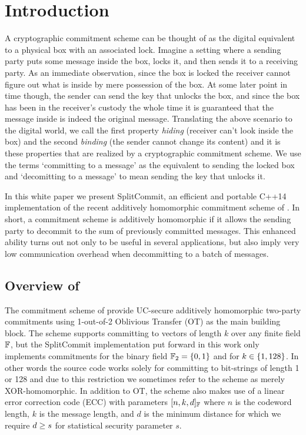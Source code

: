 \section{Introduction}

A cryptographic commitment scheme can be thought of as the digital equivalent to a  physical box with an associated lock. Imagine a setting where a sending party puts some message inside the box, locks it, and then sends it to a receiving party. As an immediate observation, since the box is locked the receiver cannot figure out what is inside by mere possession of the box. At some later point in time though, the sender can send the key that unlocks the box, and since the box has been in the receiver's custody the whole time it is guaranteed that the message inside is indeed the original message. Translating the above scenario to the digital world, we call the first property \textit{hiding} (receiver can't look inside the box) and the second \textit{binding} (the sender cannot change its content) and it is these properties that are realized by a cryptographic commitment scheme. We use the terms `committing to a message' as the equivalent to sending the locked box and `decomitting to a message' to mean sending the key that unlocks it.

In this white paper we present SplitCommit, an efficient and portable C++14 implementation of the recent additively homomorphic commitment scheme of \cite{DBLP:conf/tcc/FrederiksenJNT16}. In short, a commitment scheme is additively homomorphic if it allows the sending party to decommit to the sum of previously committed messages. This enhanced ability turns out not only to be useful in several applications, but also imply very low communication overhead when decommitting to a batch of messages.

\subsection{Overview of \cite{DBLP:conf/tcc/FrederiksenJNT16}}
The commitment scheme of \cite{DBLP:conf/tcc/FrederiksenJNT16} provide UC-secure additively homomorphic two-party commitments using 1-out-of-2 Oblivious Transfer (OT) as the main building block. The scheme supports committing to vectors of length $k$ over any finite field $\mathbb{F}$, but the SplitCommit implementation put forward in this work only implements commitments for the binary field $\mathbb{F}_2 = \left\{ 0,1 \right\}$ and for $k \in \left\{ 1,128 \right\}$. In other words the source code works solely for committing to bit-strings of length 1 or 128 and due to this restriction we sometimes refer to the scheme as merely XOR-homomorphic. In addition to OT, the scheme also makes use of a linear error correction code (ECC) with parameters $[n,k,d]_{\mathbb{F}}$ where $n$ is the codeword length, $k$ is the message length, and $d$ is the minimum distance for which we require $d \geq s$ for statistical security parameter $s$.

